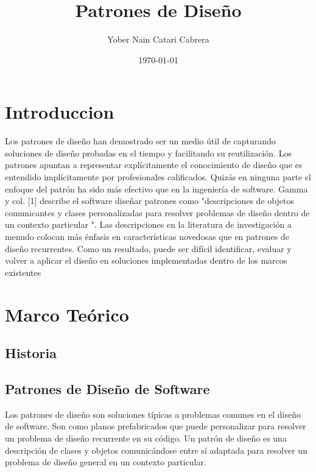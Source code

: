 \documentclass[twoside,twocolumn]{article}
\title{Patrones de Diseño} %
\author{Yober Nain Catari Cabrera  }
\date{\today} %
\begin{document}
\maketitle


\section{Introduccion}

\lettrine[nindent=0em,lines=3]{L}os patrones de diseño han demostrado ser un medio útil de
capturando soluciones de diseño probadas en el tiempo y facilitando su reutilización.
Los patrones apuntan a representar explícitamente el conocimiento de diseño que es
entendido implícitamente por profesionales calificados.
Quizás en ninguna parte el enfoque del patrón ha sido más efectivo
que en la ingeniería de software. Gamma y col. [1] describe el software
diseñar patrones como "descripciones de objetos comunicantes y
clases personalizadas para resolver problemas de diseño dentro de un
contexto particular ".
Las descripciones en la literatura de investigación a menudo colocan más
énfasis en características novedosas que en patrones de diseño recurrentes. Como un
resultado, puede ser difícil identificar, evaluar y volver a aplicar el diseño
en soluciones implementadas dentro de los marcos existentes


\section {Marco Teórico}\label{sec:3}
\subsection{ Historia}
\subsection{ Patrones de Diseño de Software}
Los patrones de diseño son soluciones típicas a problemas comunes en el diseño de software. Son como planos prefabricados que puede personalizar para resolver un problema de diseño recurrente en su código.
Un patrón de diseño es una descripción de clases y objetos comunicándose entre sí adaptada para resolver un problema de diseño general en un contexto particular.\cite{Tanembaum3}
\end{document}

